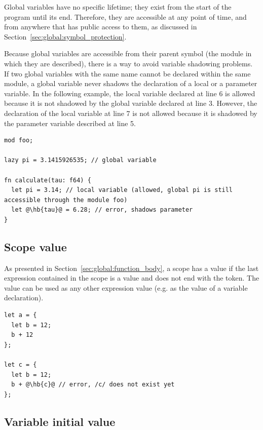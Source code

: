 Global variables have no specific lifetime; they exist from the start of the
program until its end. Therefore, they are accessible at any point of time, and
from anywhere that has public access to them, as discussed in
Section~\ref{sec:global:symbol_protection}.

Because global variables are accessible from their parent symbol (the module in
which they are described), there is a way to avoid variable shadowing problems.
If two global variables with the same name cannot be declared within the same
module, a global variable never shadows the declaration of a local or a
parameter variable. In the following example, the local variable 
declared at line 6 is allowed because it is not shadowed by the global variable
declared at line 3. However, the declaration of the local variable 
at line 7 is not allowed because it is shadowed by the parameter variable
described at line 5.

\begin{lstlisting}[style=coloredverbatimError, escapechar=@]
mod foo;

lazy pi = 3.1415926535; // global variable

fn calculate(tau: f64) {
  let pi = 3.14; // local variable (allowed, global pi is still accessible through the module foo)
  let @\hb{tau}@ = 6.28; // error, shadows parameter
}

\end{lstlisting}

\subsection{Scope value}

As presented in Section~\ref{sec:global:function_body}, a scope has a value if the last
expression contained in the scope is a value and does not end with the \token{;}
token. The value can be used as any other expression value (e.g. as the value of
a variable declaration).

\begin{lstlisting}[style=coloredverbatimError, escapechar=@]
let a = {
  let b = 12;
  b + 12
};

let c = {
  let b = 12;
  b + @\hb{c}@ // error, /c/ does not exist yet
};
\end{lstlisting}

\subsection{Variable initial value}
\label{sec:memory:variable_init_value}


